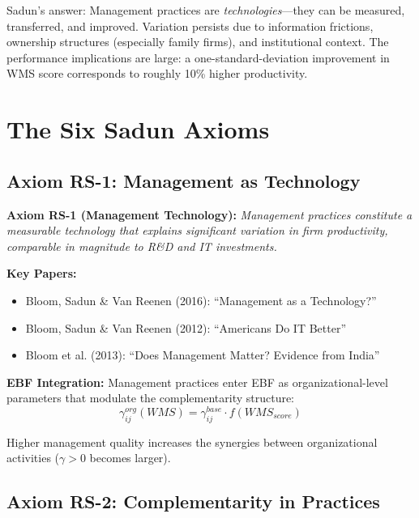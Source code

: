 Sadun's answer: Management practices are \textit{technologies}---they can be
measured, transferred, and improved. Variation persists due to information
frictions, ownership structures (especially family firms), and institutional
context. The performance implications are large: a one-standard-deviation
improvement in WMS score corresponds to roughly 10\% higher productivity.

\section{The Six Sadun Axioms}

\subsection{Axiom RS-1: Management as Technology}

\begin{tcolorbox}[colback=blue!5!white, colframe=blue!75!black]
\textbf{Axiom RS-1 (Management Technology):}
\textit{Management practices constitute a measurable technology that explains
significant variation in firm productivity, comparable in magnitude to
R\&D and IT investments.}
\end{tcolorbox}

\textbf{Key Papers:}
\begin{itemize}[nosep]
    \item Bloom, Sadun \& Van Reenen (2016): ``Management as a Technology?''
    \item Bloom, Sadun \& Van Reenen (2012): ``Americans Do IT Better''
    \item Bloom et al. (2013): ``Does Management Matter? Evidence from India''
\end{itemize}

\textbf{EBF Integration:}
Management practices enter EBF as organizational-level parameters that
modulate the complementarity structure:
\begin{equation}
\gamma^{org}_{ij}(WMS) = \gamma^{base}_{ij} \cdot f(WMS_{score})
\end{equation}

Higher management quality increases the synergies between organizational
activities ($\gamma > 0$ becomes larger).

\subsection{Axiom RS-2: Complementarity in Practices}

